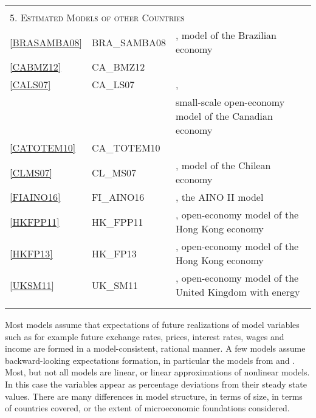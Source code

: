 \documentclass[11pt,a4paper]{article}
\begin{document}
\begin{table}[H]
\begin{tabularx}{\textwidth}{lll}
			&& \\
			\multicolumn{3}{l}{\textsc{5. Estimated Models of other Countries }} \\
			\ref{BRASAMBA08} & BRA\_SAMBA08 & \cite{Gouveaetal2008}, model of the Brazilian economy \\
			\ref{CABMZ12} & CA\_BMZ12 & \cite{Bailliuetal2012}  \\
			\ref{CALS07} & CA\_LS07 & \cite{LubikSchorfheide2007},\\
			&& small-scale open-economy model of the Canadian economy \\
			\ref{CATOTEM10} & CA\_TOTEM10 & \cite{murchison2006rennison}\\
			\ref{CLMS07} & CL\_MS07 & \cite{MedinaSoto2007}, model of the Chilean economy \\
			\ref{FIAINO16} & FI\_AINO16 & \cite{kilponen2016aino},  the AINO II model \\
			\ref{HKFPP11} & HK\_FPP11 & \cite{FunkePaetzPytlarczyk2011}, open-economy model of the Hong Kong economy \\
			\ref{HKFP13} & HK\_FP13 & \cite{FunkePaetz2013}, open-economy model of the Hong Kong economy \\
			\ref{UKSM11}&UK\_SM11 & \cite{millard2011estimated}, open-economy model of the United Kingdom with energy\\
			&& \\
			\hline \hline
			\vspace{-0.2cm}
		\end{tabularx} 
	\end{table}
	
	\footnotesize \noindent Most models assume that expectations of future realizations of model variables such as for example future exchange rates, prices, interest rates, wages and income are formed in a model-consistent, rational manner.  A few models assume backward-looking expectations formation, in particular the models from \cite{RudebuschSvensson1999} and \cite{Orphanides2003}.
	Most, but not all models are linear, or linear approximations of nonlinear models. In this case the variables appear as percentage deviations from their steady state values.  There are many differences in model structure, in terms of size, in terms of countries covered, or the extent of microeconomic foundations considered. \\
	
\end{document}
